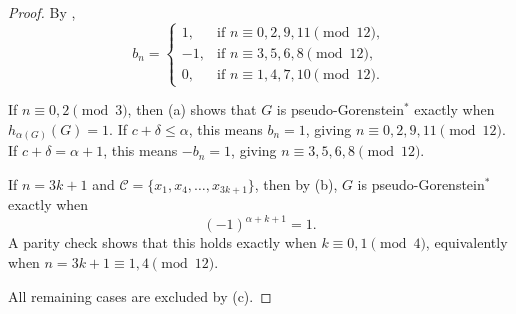 \documentclass[12pt]{amsart}
\theoremstyle{plain}
\theoremstyle{definition}
\begin{document}
\begin{proof}
By ,
\[
b_n=
\begin{cases}
1,& \text{if } n\equiv 0,2,9,11 \pmod{12},\\[4pt]
-1,& \text{if } n\equiv 3,5,6,8 \pmod{12},\\[4pt]
0,& \text{if } n\equiv 1,4,7,10 \pmod{12}.
\end{cases}
\]

If \(n\equiv 0,2\pmod 3\), then (a) shows that
\(G\) is pseudo-Gorenstein\(^{*}\) exactly when \(h_{\alpha(G)}(G)=1\). If
\(c+\delta\le \alpha\), this means \(b_n=1\), giving
\(n\equiv 0,2,9,11\pmod{12}\). If \(c+\delta=\alpha+1\), this means
\(-b_n=1\), giving \(n\equiv 3,5,6,8\pmod{12}\).

If \(n=3k+1\) and \(\mathcal C=\{x_1,x_4,\dots,x_{3k+1}\}\), then by
(b), \(G\) is pseudo-Gorenstein\(^{*}\) exactly when
\[
(-1)^{\alpha+k+1}=1.
\]
A parity check shows that this holds exactly when \(k\equiv 0,1\pmod 4\),
equivalently when \(n=3k+1\equiv 1,4\pmod{12}\).

All remaining cases are excluded by (c).
\end{proof}






\end{document}
